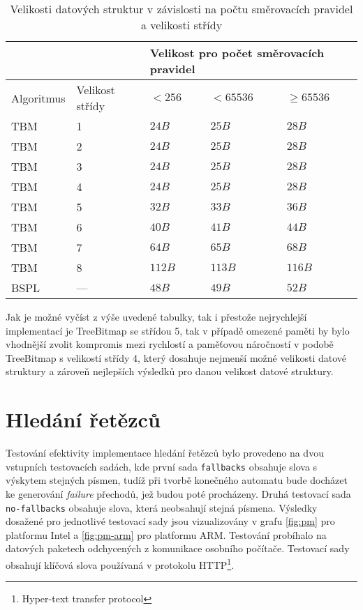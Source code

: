 \begin{table}[!htbp]
	\center
    \begin{tabular}{|l|l|l|l|l|}
    \hline
    & & \multicolumn{3}{l|}{Velikost pro počet směrovacích pravidel} \\ \hline
    Algoritmus & Velikost střídy & $< 256$ & $< 65536$ & $\geq 65536$\\ \hhline{|=|=|=|=|=|}
    TBM & 1 & $24B$ & $25B$ & $28B$ \\ \hline
    TBM & 2 & $24B$ & $25B$ & $28B$\\ \hline
    TBM & 3 & $24B$ & $25B$ & $28B$\\ \hline
    TBM & 4 & $24B$ & $25B$ & $28B$\\ \hline
    TBM & 5 & $32B$ & $33B$ & $36B$\\ \hline
    TBM & 6 & $40B$ & $41B$ & $44B$\\ \hline
    TBM & 7 & $64B$ & $65B$ & $68B$\\ \hline
    TBM & 8 & $112B$ & $113B$ & $116B$\\ \hline
    BSPL & --- & $48B$ & $49B$ & $52B$\\ \hline
    \end{tabular}
	\caption{Velikosti datových struktur v závislosti na počtu směrovacích pravidel a velikosti střídy}
    \label{tab:lpm-input}
\end{table}

Jak je možné vyčíst z výše uvedené tabulky, tak i přestože nejrychlejší implementací je TreeBitmap se střídou 5, tak v případě omezené paměti by bylo vhodnější zvolit kompromis mezi rychlostí a paměťovou náročností v podobě
TreeBitmap s velikostí střídy 4, který dosahuje nejmenší možné velikosti datové struktury a zároveň nejlepších výsledků pro danou velikost datové struktury.

\section{Hledání řetězců} %
Testování efektivity implementace hledání řetězců bylo provedeno na dvou vstupních testovacích sadách,
kde první sada \texttt{fallbacks} obsahuje slova s výskytem stejných písmen, tudíž při tvorbě konečného automatu bude
docházet ke generování \textit{failure} přechodů, jež budou poté procházeny. Druhá testovací sada \texttt{no-fallbacks}
obsahuje slova, která neobsahují stejná písmena. Výsledky dosažené pro jednotlivé testovací sady jsou
vizualizovány v grafu \ref{fig:pm} pro platformu Intel a \ref{fig:pm-arm} pro platformu ARM. Testování probíhalo na datových paketech odchycených z komunikace osobního počítače. Testovací sady obsahují klíčová slova používaná v protokolu HTTP\footnote{Hyper-text transfer protocol}.

